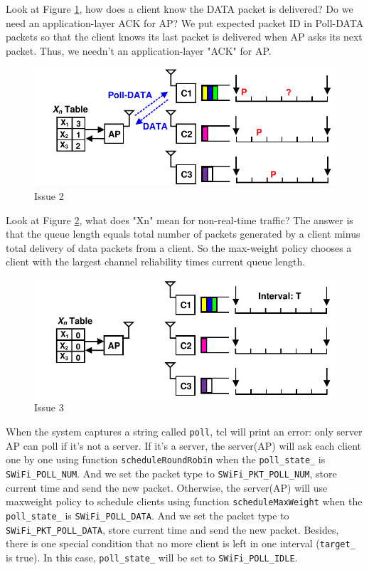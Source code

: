 \documentclass{article}
\begin{document}
Look at Figure \ref{discussion_2}, how does a client know the DATA packet is delivered? Do we need an application-layer ACK for AP?  We put expected packet ID in Poll-DATA packets so that the client knows its last packet is delivered when AP asks its next packet. Thus, we needn't an application-layer "ACK" for AP. 

\begin{figure}[htbp]
\centering
\includegraphics[scale=0.8]{discussion_2.pdf}
\caption{Issue 2}
\label{discussion_2}
\end{figure}

Look at Figure \ref{discussion_3}, what does "Xn" mean for non-real-time traffic? The answer is that the queue length equals total number of packets generated by a client minus total delivery of data packets from a client. So the max-weight policy chooses a client with the largest channel reliability times current queue length. 

\begin{figure}[htbp]
\centering
\includegraphics[scale=0.8]{discussion_3.pdf}
\caption{Issue 3}
\label{discussion_3}
\end{figure}


When the system captures a string called  \lstinline |poll|, tcl will print an error: only server AP can poll if it's not a server. If it's a server, the server(AP) will ask each client one by one using function \lstinline |scheduleRoundRobin| when the \lstinline |poll_state_| is  \lstinline |SWiFi_POLL_NUM|. And we set the packet type to \lstinline |SWiFi_PKT_POLL_NUM|, store current time and send the new packet. Otherwise, the server(AP) will use maxweight policy to schedule clients using function \lstinline |scheduleMaxWeight| when the \lstinline |poll_state_| is  \lstinline |SWiFi_POLL_DATA|. And we set the packet type to \lstinline |SWiFi_PKT_POLL_DATA|, store current time and send the new packet. Besides, there is one special condition that no more client is left in one interval (\lstinline |target_| is true). In this case, \lstinline |poll_state_| will be set to \lstinline |SWiFi_POLL_IDLE|.
\end{document}
